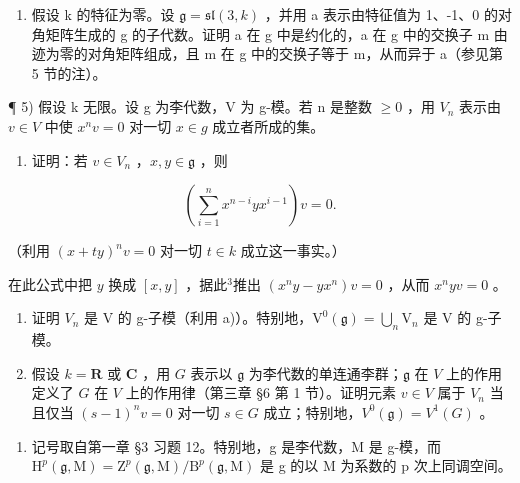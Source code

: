 \begin{enumerate}
\def\labelenumi{\arabic{enumi})}
\setcounter{enumi}{3}
\tightlist
\item
  假设 k 的特征为零。设 \(\mathfrak{g} = \mathfrak{sl}(3, k)\) ，并用 a 表示由特征值为 1、-1、0 的对角矩阵生成的 g 的子代数。证明 a 在 g 中是约化的，a 在 g 中的交换子 m 由迹为零的对角矩阵组成，且 m 在 g 中的交换子等于 m，从而异于 a（参见第 5 节的注）。
\end{enumerate}

¶ 5) 假设 k 无限。设 g 为李代数，V 为 g-模。若 n 是整数 \(\geq 0\) ，用 \(V_{n}\) 表示由 \(v \in V\) 中使 \(x^{n}v = 0\) 对一切 \(x \in g\) 成立者所成的集。

\begin{enumerate}
\def\labelenumi{\alph{enumi})}
\tightlist
\item
  证明：若 \(v \in V_n\) ，\(x, y \in \mathfrak{g}\) ，则
\end{enumerate}

\[
\left(\sum_ {i = 1} ^ {n} x ^ {n - i} y x ^ {i - 1}\right) v = 0.
\]

（利用 \((x + ty)^n v = 0\) 对一切 \(t\in k\) 成立这一事实。）

在此公式中把 \(y\) 换成 \([x, y]\) ，据此\(^3\)推出 \((x^n y - y x^n)v = 0\) ，从而 \(x^n y v = 0\) 。

\begin{enumerate}
\def\labelenumi{\alph{enumi})}
\setcounter{enumi}{1}
\item
  证明 \(V_{n}\) 是 V 的 g-子模（利用 a)）。特别地，\(\mathrm{V}^{0}(\mathfrak{g})=\bigcup_{n}\mathrm{V}_{n}\) 是 V 的 g-子模。
\item
  假设 \(k = \mathbf{R}\) 或 \(\mathbf{C}\) ，用 \(G\) 表示以 \(\mathfrak{g}\) 为李代数的单连通李群；\(\mathfrak{g}\) 在 \(V\) 上的作用定义了 \(G\) 在 \(V\) 上的作用律（第三章 §6 第 1 节）。证明元素 \(v \in V\) 属于 \(V_n\) 当且仅当 \((s - 1)^n v = 0\) 对一切 \(s \in G\) 成立；特别地，\(V^0(\mathfrak{g}) = V^1(G)\) 。
\end{enumerate}

\begin{enumerate}
\def\labelenumi{\arabic{enumi})}
\setcounter{enumi}{5}
\tightlist
\item
  记号取自第一章 §3 习题 12。特别地，g 是李代数，M 是 g-模，而 \(\mathrm{H}^{p}(\mathfrak{g},\mathrm{M})=\mathrm{Z}^{p}(\mathfrak{g},\mathrm{M})/\mathrm{B}^{p}(\mathfrak{g},\mathrm{M})\) 是 g 的以 M 为系数的 p 次上同调空间。
\end{enumerate}

